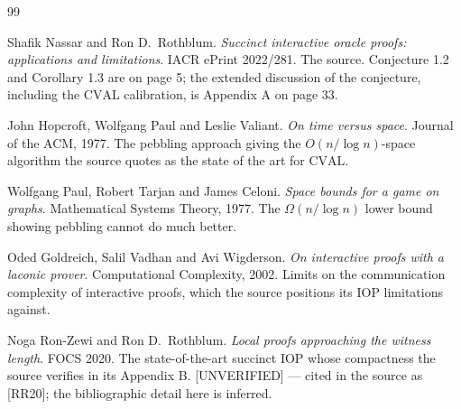 \documentclass{conjura-conjecture}
\newcommand{\Om}{\Omega}
\begin{document}
\begin{conjurabibliography}{99}

Shafik Nassar and Ron D.\ Rothblum.
\emph{Succinct interactive oracle proofs: applications and limitations}.
IACR ePrint 2022/281.
The source. Conjecture 1.2 and Corollary 1.3 are on page 5; the extended
discussion of the conjecture, including the $\mathrm{CVAL}$ calibration,
is Appendix A on page 33.

John Hopcroft, Wolfgang Paul and Leslie Valiant.
\emph{On time versus space}.
Journal of the ACM, 1977.
The pebbling approach giving the $O(n/\log n)$-space algorithm the source
quotes as the state of the art for $\mathrm{CVAL}$.

Wolfgang Paul, Robert Tarjan and James Celoni.
\emph{Space bounds for a game on graphs}.
Mathematical Systems Theory, 1977.
The $\Om(n/\log n)$ lower bound showing pebbling cannot do much better.

Oded Goldreich, Salil Vadhan and Avi Wigderson.
\emph{On interactive proofs with a laconic prover}.
Computational Complexity, 2002.
Limits on the communication complexity of interactive proofs, which the
source positions its IOP limitations against.

Noga Ron-Zewi and Ron D.\ Rothblum.
\emph{Local proofs approaching the witness length}.
FOCS 2020.
The state-of-the-art succinct IOP whose compactness the source verifies
in its Appendix B\@. [UNVERIFIED] --- cited in the source as [RR20]; the
bibliographic detail here is inferred.

\end{conjurabibliography}
\end{document}
